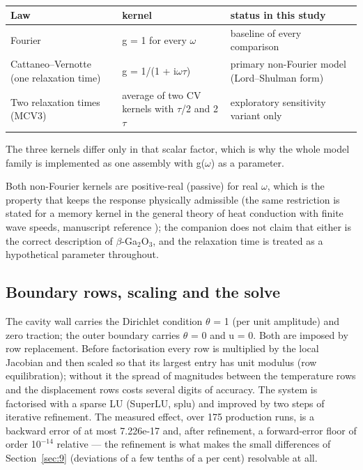 \documentclass[preprint,12pt]{elsarticle}
\begin{document}
\begin{table}[htbp]
\centering
\caption{}
\label{tab:?}
\begin{tabularx}{\textwidth}{XXX}
\toprule
Law & kernel & status in this study \\
\midrule
Fourier & g = 1 for every $\omega$ & baseline of every comparison \\
Cattaneo--Vernotte (one relaxation time) & g = 1/(1 + i$\omega \tau$) & primary non-Fourier model (Lord--Shulman form) \\
Two relaxation times (MCV3) & average of two CV kernels with $\tau$/2 and 2$\tau$ & exploratory sensitivity variant only \\
\bottomrule
\end{tabularx}
\end{table}

The three kernels differ only in that scalar factor, which is why the whole model family is implemented as one assembly with g($\omega$) as a parameter.

Both non-Fourier kernels are positive-real (passive) for real $\omega$, which is the property that keeps the response physically admissible (the same restriction is stated for a memory kernel in the general theory of heat conduction with finite wave speeds, manuscript reference \cite{gurtin1968}); the companion does not claim that either is the correct description of $\beta$-Ga$_2$O$_3$, and the relaxation time is treated as a hypothetical parameter throughout.

\subsection{Boundary rows, scaling and the solve}
\label{sec:7.3}

The cavity wall carries the Dirichlet condition $\theta$ = 1 (per unit amplitude) and zero traction; the outer boundary carries $\theta$ = 0 and u = 0. Both are imposed by row replacement. Before factorisation every row is multiplied by the local Jacobian and then scaled so that its largest entry has unit modulus (row equilibration); without it the spread of magnitudes between the temperature rows and the displacement rows costs several digits of accuracy. The system is factorised with a sparse LU (SuperLU, splu) and improved by two steps of iterative refinement. The measured effect, over 175 production runs, is a backward error of at most 7.226e-17 and, after refinement, a forward-error floor of order 1$0^{-14}$ relative --- the refinement is what makes the small differences of Section~\ref{sec:9} (deviations of a few tenths of a per cent) resolvable at all.
\end{document}
